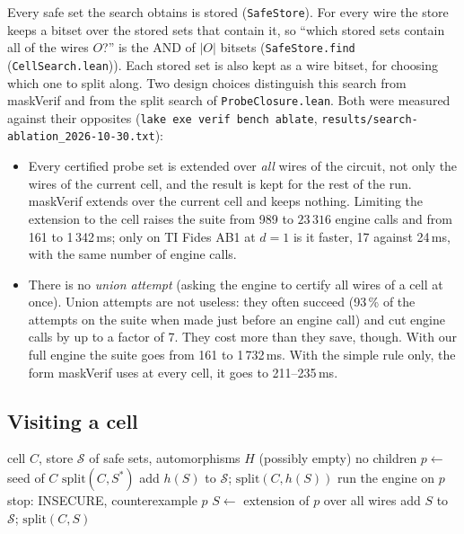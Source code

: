 \documentclass[11pt,a4paper]{article}
\theoremstyle{definition}
\theoremstyle{remark}
\newcommand{\code}[1]{\texttt{\small #1}}
\newcommand{\lean}[2]{\code{#1}\,(\code{#2})}
\begin{document}
Every safe set the search obtains is stored (\code{SafeStore}).  For every wire the store
keeps a bitset over the stored sets that contain it, so ``which stored sets contain all of
the wires $O$?'' is the AND of $|O|$ bitsets (\lean{SafeStore.find}{CellSearch.lean}).
Each stored set is also kept as a wire bitset, for choosing which one to split along.
Two design choices distinguish this search from maskVerif and from the split search of
\code{ProbeClosure.lean}.  Both were measured against their opposites
(\code{lake exe verif bench ablate}, \code{results/search-ablation\_2026-10-30.txt}):
\begin{itemize}[leftmargin=*]
\item Every certified probe set is extended over \emph{all} wires of the circuit, not only
  the wires of the current cell, and the result is kept for the rest of the run.  maskVerif
  extends over the current cell and keeps nothing.  Limiting the extension to the cell raises
  the suite from 989 to $23\,316$ engine calls and from 161 to 1\,342\,ms; only on TI Fides
  AB1 at $d=1$ is it faster, 17 against 24\,ms, with the same number of engine calls.
\item There is no \emph{union attempt} (asking the engine to certify all wires of a cell at
  once).  Union attempts are not useless: they often succeed (93\,\% of the attempts on the
  suite when made just before an engine call) and cut engine calls by up to a factor of 7.
  They cost more than they save, though.  With our full engine the suite goes from 161 to
  1\,732\,ms.  With the simple rule only, the form maskVerif uses at every cell, it goes to
  211--235\,ms.
\end{itemize}

\subsection{Visiting a cell}

\begin{algorithm}[ht]
\caption{One cell visit (\lean{visitCell}{CellSearch.lean})}\label{alg:visit}
\begin{algorithmic}[1]
\Require cell $C$, store $\mathcal S$ of safe sets, automorphisms $H$ (possibly empty)
 \Return no children 
\EndIf
\State $p\gets$ seed of $C$
  \State \Return $\mathrm{split}(C, S^\ast)$ 
\EndIf
{} 
  \State add $h(S)$ to $\mathcal S$; \Return $\mathrm{split}(C, h(S))$
\EndIf
\State run the engine on $p$ \Comment{\code{checkChosenCoupling}}
 \State stop: INSECURE, counterexample $p$ \EndIf
\State $S\gets$ extension of $p$ over all wires \Comment{\code{couplingExtend}}
\State add $S$ to $\mathcal S$; \Return $\mathrm{split}(C,S)$
\end{algorithmic}
\end{algorithm}
\end{document}
